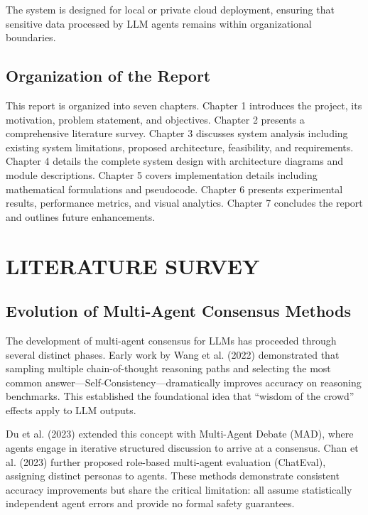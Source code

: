 \documentclass[12pt,a4paper]{report}
\begin{document}
The system is designed for local or private cloud deployment, ensuring that sensitive data processed by LLM agents remains within organizational boundaries.

\section{Organization of the Report}

This report is organized into seven chapters. Chapter 1 introduces the project, its motivation, problem statement, and objectives. Chapter 2 presents a comprehensive literature survey. Chapter 3 discusses system analysis including existing system limitations, proposed architecture, feasibility, and requirements. Chapter 4 details the complete system design with architecture diagrams and module descriptions. Chapter 5 covers implementation details including mathematical formulations and pseudocode. Chapter 6 presents experimental results, performance metrics, and visual analytics. Chapter 7 concludes the report and outlines future enhancements.

\chapter{LITERATURE SURVEY}

\section{Evolution of Multi-Agent Consensus Methods}

The development of multi-agent consensus for LLMs has proceeded through several distinct phases. Early work by Wang et al. (2022) demonstrated that sampling multiple chain-of-thought reasoning paths and selecting the most common answer---Self-Consistency---dramatically improves accuracy on reasoning benchmarks. This established the foundational idea that ``wisdom of the crowd'' effects apply to LLM outputs.

Du et al. (2023) extended this concept with Multi-Agent Debate (MAD), where agents engage in iterative structured discussion to arrive at a consensus. Chan et al. (2023) further proposed role-based multi-agent evaluation (ChatEval), assigning distinct personas to agents. These methods demonstrate consistent accuracy improvements but share the critical limitation: all assume statistically independent agent errors and provide no formal safety guarantees.
\end{document}

